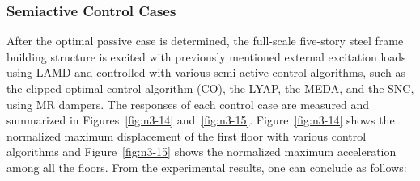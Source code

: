 \subsubsection{Semiactive Control Cases}

After the optimal passive case is determined, the full-scale five-story steel frame building structure is excited with previously mentioned external excitation loads using LAMD and controlled with various semi-active control algorithms, such as the clipped optimal control algorithm (CO), the LYAP, the MEDA, and the SNC, using MR dampers. The responses of each control case are measured and summarized in Figures~\ref{fig:n3-14} and~\ref{fig:n3-15}. Figure~\ref{fig:n3-14} shows the normalized maximum displacement of the first floor with various control algorithms and Figure~\ref{fig:n3-15} shows the normalized maximum acceleration among all the floors. From the experimental results, one can conclude as follows:

